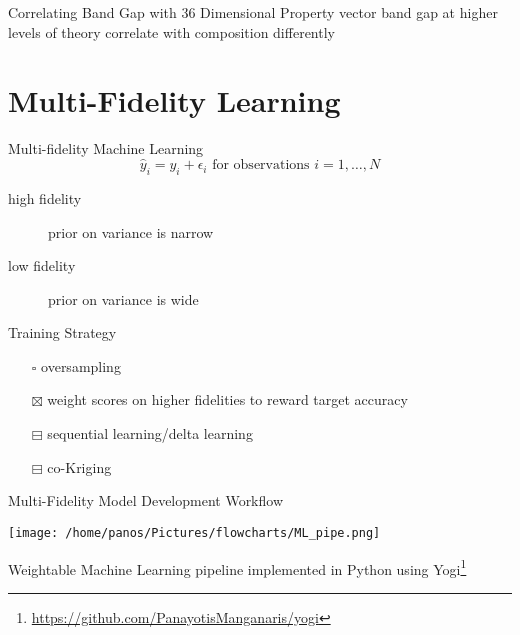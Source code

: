 \documentclass[10pt, aspectratio=169, presentation]{beamer}
\begin{document}
\begin{frame}[label={sec:orgd452511}]{Correlating Band Gap with 36 Dimensional Property vector}
band gap at higher levels of theory correlate with composition differently\autocite{yang-2023-high-throug}

 
\begin{center}

\end{center}
\end{frame}

\section{Multi-Fidelity Learning}
\label{sec:org3ad1eb6}
\begin{frame}[label={sec:org5442454}]{Multi-fidelity Machine Learning}
\[
\hat{y}_i = y_i + \epsilon_i \mbox{ for observations } i=1,…,N
\]

\begin{description}
\item[{high fidelity}] prior on variance is narrow
\item[{low fidelity}] prior on variance is wide
\end{description}

\begin{block}{Training Strategy}
\begin{itemize}
\item[{$\square$}] oversampling
\item[{$\boxtimes$}] weight scores on higher fidelities to reward target accuracy
\item[{$\boxminus$}] sequential learning/delta learning
\item[{$\boxminus$}] co-Kriging
\end{itemize}
\end{block}
\end{frame}

\begin{frame}[label={sec:org919bdb9}]{Multi-Fidelity Model Development Workflow}
\begin{center}
\texttt{[image: /home/panos/Pictures/flowcharts/ML\_pipe.png]}
\end{center}

Weightable Machine Learning pipeline implemented in Python using Yogi\footnote{\tiny{}\url{https://github.com/PanayotisManganaris/yogi}\label{org790dce2}}
\autocite{manganaris-2022-mrs-comput}
\end{frame}
\end{document}
